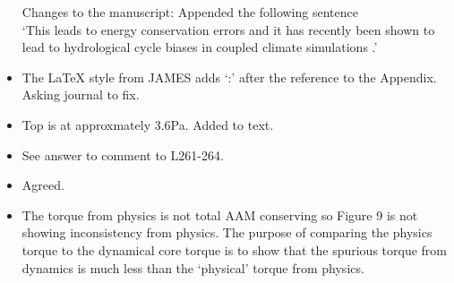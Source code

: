 \documentclass[11pt]{article}
\begin{document}
\begin{itemize}
Changes to the manuscript: Appended the following sentence\\

`This leads to energy conservation errors and it has recently been shown to lead to hydrological cycle biases in coupled climate simulations \citep{water-leak}.'




\item {\color{blue}{L586: ... Appendix D. When ...}}

The LaTeX style from JAMES adds `:' after the reference to the Appendix. Asking journal to fix.

\item {\color{blue}{L701: Please specify the model top of the 32 level version used here.}}

Top is at approxmately 3.6Pa. Added to text.

\item {}

See answer to comment to L261-264.

\item {\color{blue}{L803-806: If the explanations outlined in Fig.8 holds, the same effects should unfold in realistic experiments, though they might be less visible.}}

Agreed.

\item {\color{blue}{L830-835: What is the expectation for the physical torque? Is the observed wind torque consistent with AAM variations of the atmosphere, or does Fig.9 show some inconsistency in the physics?}}

The torque from physics is not total AAM conserving so Figure 9 is not showing inconsistency from physics. The purpose of comparing the physics torque to the dynamical core torque is to show that the spurious torque from dynamics is much less than the `physical' torque from physics.


\end{itemize}
\end{document}
